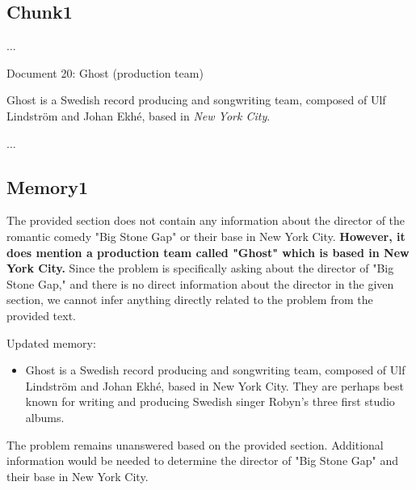 \begin{tcolorbox}
\subsection*{Chunk1}
\vspace{-5pt}

...

Document 20:
Ghost (production team)

Ghost is a Swedish record producing and songwriting team, composed of Ulf Lindström and Johan Ekhé, based in \textit{New York City}.

...
\vspace{5pt}
\subsection*{Memory1}
\vspace{-5pt}
The provided section does not contain any information about the director of the romantic comedy "Big Stone Gap" or their base in New York City. \textbf{However, it does mention a production team called "Ghost" which is based in New York City.} Since the problem is specifically asking about the director of "Big Stone Gap," and there is no direct information about the director in the given section, we cannot infer anything directly related to the problem from the provided text.

Updated memory:
\begin{itemize}
    \item Ghost is a Swedish record producing and songwriting team, composed of Ulf Lindström and Johan Ekhé, based in New York City. They are perhaps best known for writing and producing Swedish singer Robyn's three first studio albums.
\end{itemize}


The problem remains unanswered based on the provided section. Additional information would be needed to determine the director of "Big Stone Gap" and their base in New York City.


\end{tcolorbox}